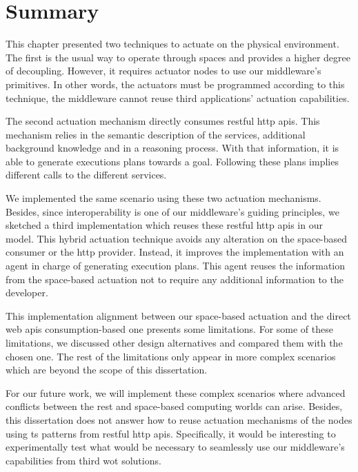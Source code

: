 \section{Summary}
\label{sec:actuation_summary}

This chapter presented two techniques to actuate on the physical environment.
The first is the usual way to operate through spaces and provides a higher degree of decoupling.
However, it requires actuator nodes to use our middleware's primitives. %
In other words, the actuators must be programmed according to this technique, the middleware cannot reuse third applications' actuation capabilities.


The second actuation mechanism directly consumes \ac{rest}ful \acs{http} \acsp{api}.
This mechanism relies in the semantic description of the services, additional background knowledge and in a reasoning process. %
With that information, it is able to generate executions plans towards a goal.
Following these plans implies different calls to the different services.


We implemented the same scenario using these two actuation mechanisms.
Besides, since interoperability is one of our middleware's guiding principles, we sketched a third implementation which reuses these \ac{rest}ful \acs{http} \acsp{api} in our \Space{} model.
This hybrid actuation technique avoids any alteration on the space-based consumer or the \ac{http} provider.
Instead, it improves the \Space{} implementation with an agent in charge of generating execution plans.
This agent reuses the information from the space-based actuation not to require any additional information to the developer.


This implementation alignment between our space-based actuation and the direct web \acsp{api} consumption-based one presents some limitations.
For some of these limitations, we discussed other design alternatives and compared them with the chosen one.
The rest of the limitations only appear in more complex scenarios which are beyond the scope of this dissertation.


For our future work, we will implement these complex scenarios where advanced conflicts between the \ac{rest} and space-based computing worlds can arise.
Besides, this dissertation does not answer how to reuse actuation mechanisms of the nodes using \ac{ts} patterns from \ac{rest}ful \acs{http} \acsp{api}.
Specifically, it would be interesting to experimentally test what would be necessary to seamlessly use our middleware's capabilities from  third \ac{wot} solutions.